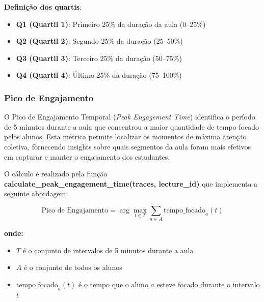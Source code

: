 \textbf{Definição dos quartis}:
\begin{itemize}
    \item \textbf{Q1 (Quartil 1)}: Primeiro 25\% da duração da aula (0--25\%)
    \item \textbf{Q2 (Quartil 2)}: Segundo 25\% da duração (25--50\%)
    \item \textbf{Q3 (Quartil 3)}: Terceiro 25\% da duração (50--75\%)
    \item \textbf{Q4 (Quartil 4)}: Último 25\% da duração (75--100\%)
\end{itemize}


\subsubsection{Pico de Engajamento}
O Pico de Engajamento Temporal (\textit{Peak Engagement Time}) identifica o período de 5 minutos durante a aula que concentrou a maior quantidade de tempo focado pelos alunos. Esta métrica permite localizar os momentos de máxima atenção coletiva, fornecendo insights sobre quais segmentos da aula foram mais efetivos em capturar e manter o engajamento dos estudantes.

O cálculo é realizado pela função \textbf{calculate\_peak\_engagement\_time(traces, lecture\_id)} que implementa a seguinte abordagem:

\begin{equation}
\text{Pico de Engajamento} = \arg\max_{t \in T} \sum_{a \in A} \text{tempo\_focado}_a(t)
\end{equation}

\textbf{onde:}
\begin{itemize}
    \item $T$ é o conjunto de intervalos de 5 minutos durante a aula
    \item $A$ é o conjunto de todos os alunos
    \item $\text{tempo\_focado}_a(t)$ é o tempo que o aluno $a$ esteve focado durante o intervalo $t$
\end{itemize}

% 


